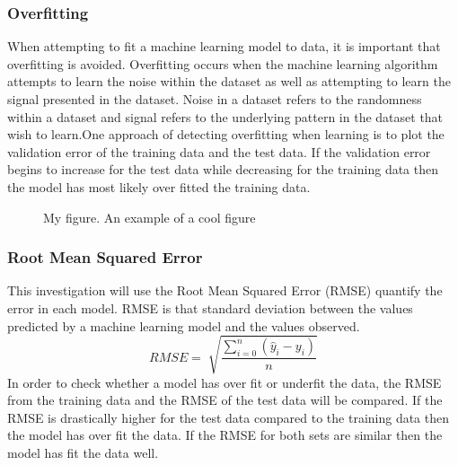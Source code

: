 \documentclass[a4paper,11pt,twoside]{article}
\begin{document}
\subsubsection{Overfitting}
When attempting to fit a machine learning model to data, it is important that overfitting is avoided. Overfitting occurs when the machine learning algorithm attempts to learn the noise within the dataset as well as attempting to learn the signal presented in the dataset. Noise in a dataset refers to the randomness within a dataset and signal refers to the underlying pattern in the dataset that wish to learn.One approach of detecting overfitting when learning is to plot the validation error of the training data and the test data. If the validation error begins to increase for the test data while decreasing for the training data then the model has most likely over fitted the training data. 

      \begin{figure}[!htb]
        \caption{\label{fig:my-label} My figure.  An example of a cool figure}
      \end{figure}

\subsubsection{Root Mean Squared Error}
This investigation will use the Root Mean Squared Error (RMSE) quantify the error in each model. RMSE is that standard deviation between the values predicted by a machine learning model and the values observed.
\begin{equation}
RMSE = \sqrt[]{\frac{\sum_{i=0}^{n}(\hat{y}_{i} - y_{i})}{n}}
\end{equation}
In order to check whether a model has over fit or underfit the data, the RMSE from the training data and the RMSE of the test data will be compared. If the RMSE is drastically higher for the test data compared to the training data then the model has over fit the data. If the RMSE for both sets are similar then the model has fit the data well. 
\end{document}
